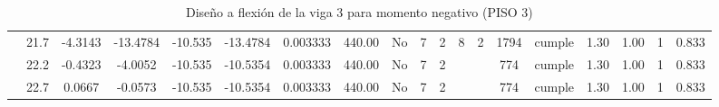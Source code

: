 \begin{table}[H]
{\begin{tabular}{|c|c|c|c|c|c|r|c|c|c|c|c|c|c|c|c|c|c|c|}
\cline{2-19}        & 21.7 & -4.3143 & -13.4784 & -10.535 & -13.4784 & 0.003333 & 440.00 & No  & 7   & 2   & 8   & 2   & 1794 & \cellcolor[rgb]{ .776,  .937,  .808}cumple & 1.30 & 1.00 & 1   & 0.833 \bigstrut\\
\cline{2-19}        & 22.2 & -0.4323 & -4.0052 & -10.535 & -10.5354 & 0.003333 & 440.00 & No  & 7   & 2   &     &     & 774 & \cellcolor[rgb]{ .776,  .937,  .808}cumple & 1.30 & 1.00 & 1   & 0.833 \bigstrut\\
\cline{2-19}        & 22.7 & 0.0667 & -0.0573 & -10.535 & -10.5354 & 0.003333 & 440.00 & No  & 7   & 2   &     &     & 774 & \cellcolor[rgb]{ .776,  .937,  .808}cumple & 1.30 & 1.00 & 1   & 0.833 \bigstrut\\
    \hline
    \end{tabular}%
  }
      \caption{Diseño a flexión de la viga 3 para momento negativo (PISO 3) }
  \label{tab:F VG3 P2 M-}%
\end{table}%
